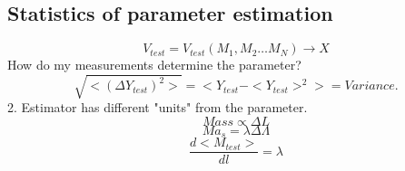 \subsection{Statistics of parameter estimation}
\[
    V_{test} = V_{test}  (M_1, M_2 \ldots M_N ) \to X
\]
How do my measurements determine the parameter?
\[
    \sqrt{<(\Delta Y_{test})^2>} = <Y_{test}-<Y_{test}>^2  > = Variance.
\]
2. Estimator has different "units" from the parameter. 
\[
    Mass \propto \Delta L
\]
\[
    Ma_{s}  = \lambda \Delta \Lambda
\]
\[
    \frac{d<M_{test}> }{dl}= \lambda
\]